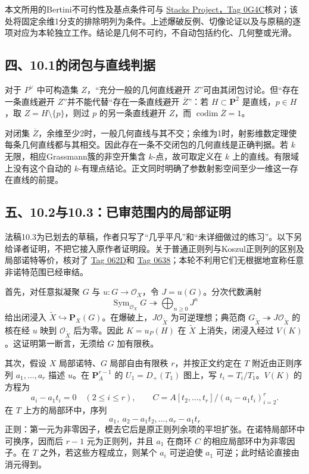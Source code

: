 本文所用的Bertini不可约性及基点条件可与
\href{https://stacks.math.columbia.edu/tag/0G4C}{Stacks Project，Tag 0G4C}核对；该处将固定余维1分支的排除明列为条件。上述爆破反例、切像论证以及与原稿的逐项对应为本轮独立工作。结论是几何不可约，不自动包括约化、几何整或光滑。

\subsection*{四、10.1的闭包与直线判据}
对于 $P^\vee$ 中可构造集 $Z$，“充分一般的几何直线避开 $Z$”可由其闭包讨论。但“存在一条直线避开 $Z$”并不能代替“存在一条直线避开 $\overline Z$”：若 $H\subset\mathbf P^2$ 是直线，$p\in H$，取 $Z=H\setminus\{p\}$，则过 $p$ 的另一条直线避开 $Z$，而 $\operatorname{codim}\overline Z=1$。

对闭集 $\overline Z$，余维至少2时，一般几何直线与其不交；余维为1时，射影维数定理使每条几何直线都与其相交。因此存在一条不交闭包的几何直线是正确判据。若 $k$ 无限，相应Grassmann簇的非空开集含 $k$-点，故可取定义在 $k$ 上的直线。有限域上没有这个自动的 $k$-有理点结论。正文同时明确了参数射影空间至少一维这一存在直线的前提。

\subsection*{五、10.2与10.3：已审范围内的局部证明}
法稿10.3为已划去的草稿，作者只写了“几乎平凡”和“未详细做过的练习”。以下另给译者证明，不把它接入原作者证明段。关于普通正则列与Koszul正则列的区别及局部诺特等价，核对了
\href{https://stacks.math.columbia.edu/tag/062D}{Tag 062D}和
\href{https://stacks.math.columbia.edu/tag/0638}{Tag 0638}；本轮不利用它们无根据地宣称任意非诺特范围已经审结。

首先，对任意拟凝聚 $G$ 与 $u:G\to\mathcal O_X$，令 $J=u(G)$。分次代数满射
\[
 \operatorname{Sym}_{\mathcal O_X}G
 \twoheadrightarrow \bigoplus_{n\ge0}J^n
\]
给出闭浸入 $\widetilde X\hookrightarrow\mathbf P_X(G)$。在爆破上，$J\mathcal O_{\widetilde X}$ 为可逆理想；典范商 $G_{\widetilde X}\twoheadrightarrow J\mathcal O_{\widetilde X}$ 的核在经 $u$ 映到 $\mathcal O_{\widetilde X}$ 后为零。因此 $K=u_P(H)$ 在 $\widetilde X$ 上消失，闭浸入经过 $V(K)$。这证明第一断言，无须给 $G$ 加有限秩。

其次，假设 $X$ 局部诺特、$G$ 局部自由有限秩 $r$，并按正文约定在 $T$ 附近由正则序列 $a_1,\ldots,a_r$ 描述 $u$。在 $\mathbf P^{r-1}_A$ 的 $U_1=D_+(T_1)$ 图上，写 $t_i=T_i/T_1$。$V(K)$ 的方程为
\[
 a_i-a_1t_i=0\quad(2\le i\le r),
 \qquad
 C=A[t_2,\ldots,t_r]/(a_i-a_1t_i)_{i=2}^r.
\]
在 $T$ 上方的局部环中，序列
\[
 a_1,\ a_2-a_1t_2,\ldots,a_r-a_1t_r
\]
正则：第一元为非零因子，模去它后是原正则列余项的平坦扩张。在诺特局部环中可换序，因而后 $r-1$ 元为正则列，并且 $a_1$ 在商环 $C$ 的相应局部环中为非零因子。在 $T$ 之外，若这些方程成立，则某个 $a_i$ 可逆迫使 $a_1$ 可逆；此时结论直接由消元得到。

